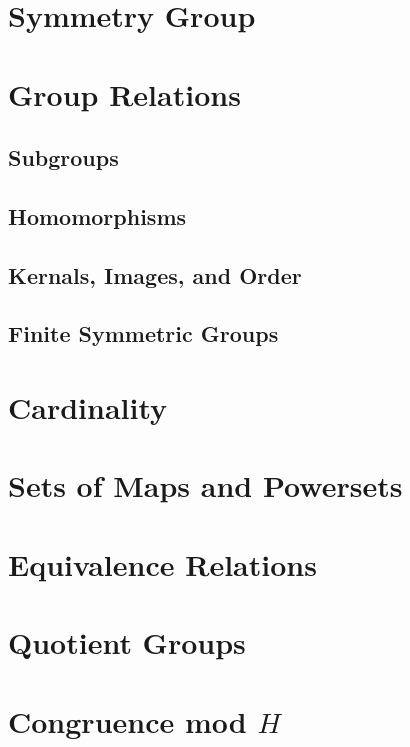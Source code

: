 \documentclass{report}
\begin{document}


\section{Symmetry Group}

\section{Group Relations}

\subsection{Subgroups}
\subsection{Homomorphisms}
\subsection{Kernals, Images, and Order}
\subsection{Finite Symmetric Groups}




\section{Cardinality}
\section{Sets of Maps and Powersets}
\section{Equivalence Relations}
\section{Quotient Groups}
\section{Congruence mod \( H \)}


\end{document}
